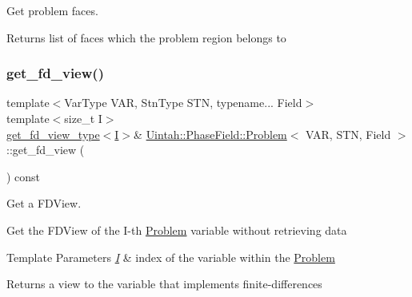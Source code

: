 Get problem faces. 

\begin{DoxyReturn}{Returns}
list of faces which the problem region belongs to 
\end{DoxyReturn}
\mbox{\label{classUintah_1_1PhaseField_1_1Problem_a6e1beb1a9b10e0019116af1eb3aeea8b}} 
\subsubsection{\texorpdfstring{get\+\_\+fd\+\_\+view()}{get\_fd\_view()}\hspace{0.1cm}{\footnotesize\ttfamily [1/4]}}
{\footnotesize\ttfamily template$<$Var\+Type V\+AR, Stn\+Type S\+TN, typename... Field$>$ \\
template$<$size\+\_\+t I$>$ \\
\hyperlink{classUintah_1_1PhaseField_1_1Problem_a89c10e32620acbe3cae959667a1cdd3e}{get\+\_\+fd\+\_\+view\+\_\+type}$<$\hyperlink{structUintah_1_1PhaseField_1_1I}{I}$>$\& \hyperlink{classUintah_1_1PhaseField_1_1Problem}{Uintah\+::\+Phase\+Field\+::\+Problem}$<$ V\+AR, S\+TN, Field $>$\+::get\+\_\+fd\+\_\+view (\begin{DoxyParamCaption}{ }\end{DoxyParamCaption}) const\hspace{0.3cm}{\ttfamily [inline]}}



Get a F\+D\+View. 

Get the F\+D\+View of the I-\/th \hyperlink{classUintah_1_1PhaseField_1_1Problem}{Problem} variable without retrieving data


\begin{DoxyTemplParams}{Template Parameters}
{\em \hyperlink{structUintah_1_1PhaseField_1_1I}{I}} & index of the variable within the \hyperlink{classUintah_1_1PhaseField_1_1Problem}{Problem} \\
\hline
\end{DoxyTemplParams}
\begin{DoxyReturn}{Returns}
a view to the variable that implements finite-\/differences 
\end{DoxyReturn}
\mbox{\label{classUintah_1_1PhaseField_1_1Problem_a619b0a0b56f6ef1f6d4e6d601c9a3521}} 
